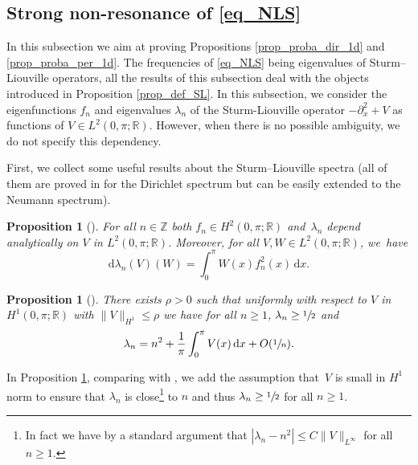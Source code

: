 \documentclass[JEP,XML,SOM,Unicode,NoEqCountersInSection,published]{cedram}
\newtheorem{proposition}[theorem]{Proposition}
\theoremstyle{definition}
\begin{document}
\subsection{Strong non-resonance of \eqref{eq_NLS}} In this subsection we aim at proving Propositions \ref{prop_proba_dir_1d} and \ref{prop_proba_per_1d}. The frequencies of \eqref{eq_NLS} being eigenvalues of Sturm--Liouville operators, all the results of this subsection deal with the objects introduced in Proposition \ref{prop_def_SL}. In this subsection, we consider the eigenfunctions $f_n$ and eigenvalues $\lambda_n$ of the Sturm-Liouville operator $-\partial_x^2 +V$ as functions of $V \in L^2(0,\pi;\mathbb{R})$. However, when there is no possible ambiguity, we do not specify this dependency.

First, we collect some useful results about the Sturm--Liouville spectra (all of them are proved in \cite{PT} for the Dirichlet spectrum but can be easily extended to the Neumann spectrum).
\begin{proposition}[{\cite[Th.\,3, p.\,31]{PT}}] \label{prop_smooth_spec} For all $n\in \mathbb{Z}$ both $f_n \in H^2(0,\pi;\mathbb{R})$ and~$\lambda_n$ depend analytically on $V$ in $L^2(0,\pi;\mathbb{R})$. Moreover, for all $V,W \in L^2(0,\pi;\mathbb{R})$, we~have%
\begin{equation}
\label{eq_diff_lambda}
\mathrm{d} \lambda_n (V)(W) = \int_0^\pi W(x) f_n^2(x) \, \mathrm{d}x.
\end{equation}
\end{proposition}

\begin{proposition}[{\cite[Th.\,4, p.\,35]{PT}}]
\label{prop_it_acumulates} {There exists $\rho>0$ such that} uniformly with respect to $V$ in $H^1(0,\pi;\mathbb{R})$ with
$\|V\|_{H^1}\leq \rho$
we have for all $n\geq1$, $\lambda_n \geq\sfrac12$ and
\[
\lambda_n = n^2 + \frac1\pi \int_{0}^{\pi} V(x)\, \mathrm{d}x + O(\sfrac1n).
\]
\end{proposition}
In Proposition \ref{prop_it_acumulates}, comparing with \cite[Th.\,4 p.\,35]{PT}, we add the assumption that~$V$ is small in $H^1$ norm to ensure that $\lambda_n$ is close\footnote{In fact we have by a standard argument that $|\lambda_n -n^2|\leq C\| V\|_{L^\infty}$ for all $n\geq1$.} to $n$ and thus $\lambda_n \geq\sfrac12$ for all $n\geq1$.
\end{document}
